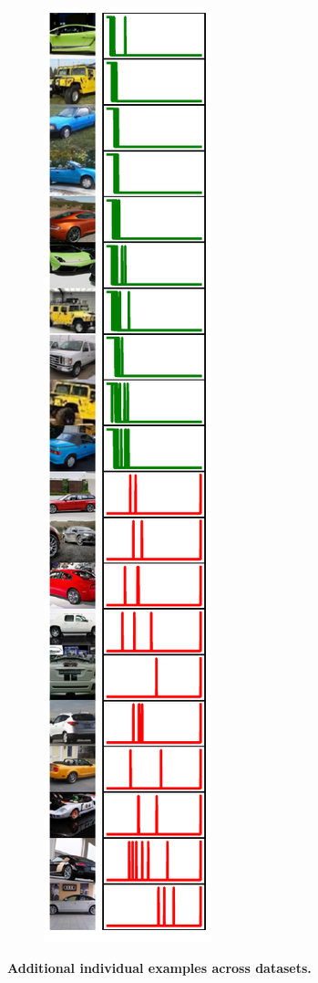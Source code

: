 \begin{figure}[t]
\begin{subfigure}[b]{0.23\linewidth}
\end{subfigure}
\hfill
\begin{subfigure}[b]{0.23\linewidth}
  \centering
  \includegraphics[width=\linewidth]{figs/sptd/cars_points_ext.pdf}
\end{subfigure}

\caption[\textbf{Additional individual examples across datasets.}]{\textbf{Additional individual examples across datasets.}}
\label{fig:indiv_ex_ext}
\end{figure}


